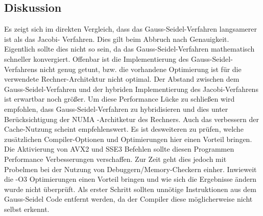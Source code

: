\documentclass[a4paper,12pt]{scrartcl}
\begin{document}
\subsection{Diskussion}
Es zeigt sich im direkten Vergleich, dass das Gauss-Seidel-Verfahren langsamerer ist als das Jacobi- Verfahren. Dies gilt beim Abbruch nach Genauigkeit. Eigentlich sollte dies nicht so sein, da das Gauss-Seidel-Verfahren mathematisch schneller konvergiert.
Offenbar ist die Implementierung des Gauss-Seidel-Verfahrens nicht genug getunt, bzw. die vorhandene Optimierung ist für die verwendete Rechner-Architektur nicht optimal.
Der Abstand zwischen dem Gauss-Seidel-Verfahren und der hybriden Implementierung des Jacobi-Verfahrens ist erwartbar noch größer. 
Um diese Performance Lücke zu schließen wird empfohlen, dass Gauss-Seidel-Verfahren zu hybridisieren und dies unter Berücksichtigung der NUMA -Architketur des Rechners. Auch das verbessern der Cache-Nutzung scheint empfehlenswert. 
Es ist desweiteren zu prüfen, welche zusätzlichen Compiler-Optionen und Optimierungen hier einen Vorteil bringen. Die Aktivierung von AVX2 und SSE3 Befehlen sollte diesen Programmen Performance Verbesserungen verschaffen. Zur Zeit geht dies jedoch mit Probelmen bei der Nutzung von Debuggern/Memory-Checkern einher. 
Inwieweit die -O3 Optimierungen einen Vorteil bringen und wie sich die Ergebnisse ändern wurde nicht überprüft. 
Als erster Schritt sollten unnötige Instruktionen aus dem Gauss-Seidel Code entfernt werden, da der Compiler diese möglicherweise nicht selbst erkennt.
\end{document}
